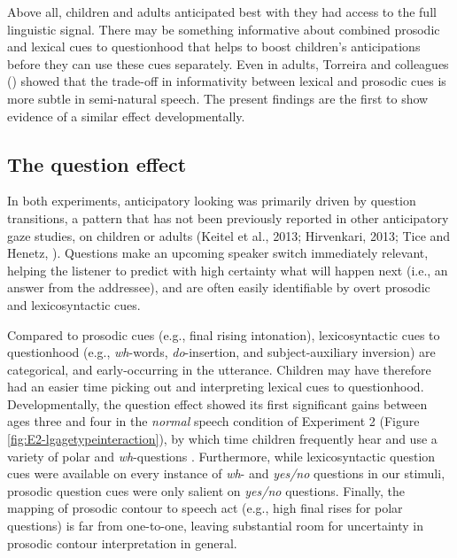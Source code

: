 \documentclass[authoryear, 12pt]{elsarticle}
\begin{document}
Above all, children and adults anticipated best with they had access to the full linguistic signal. There may be something informative about combined prosodic and lexical cues to questionhood that helps to boost children's anticipations before they can use these cues separately. Even in adults, Torreira and colleagues (\citeyear{torreira2015}) showed that the trade-off in informativity between lexical and prosodic cues is more subtle in semi-natural speech. The present findings are the first to show evidence of a similar effect developmentally.

\subsection{The question effect}

In both experiments, anticipatory looking was primarily driven by question transitions, a pattern that has not been previously reported in other anticipatory gaze studies, on children or adults (Keitel et al., 2013; Hirvenkari, 2013; Tice and Henetz, \citeyear{TiceHenetz11}). Questions make an upcoming speaker switch immediately relevant, helping the listener to predict with high certainty what will happen next (i.e., an answer from the addressee), and are often easily identifiable by overt prosodic and lexicosyntactic cues.

Compared to prosodic cues (e.g., final rising intonation), lexicosyntactic cues to questionhood (e.g., \textit{wh}-words, \textit{do}-insertion, and subject-auxiliary inversion) are categorical, and early-occurring in the utterance. Children may have therefore had an easier time picking out and interpreting lexical cues to questionhood. Developmentally, the question effect showed its first significant gains between ages three and four in the \textit{normal} speech condition of Experiment 2 (Figure \ref{fig:E2-lgagetypeinteraction}), by which time children frequently hear and use a variety of polar and \textit{wh}-questions \citep{clark2009}. Furthermore, while lexicosyntactic question cues were available on every instance of \textit{wh}- and \textit{yes/no} questions in our stimuli, prosodic question cues were only salient on \textit{yes/no} questions. Finally, the mapping of prosodic contour to speech act (e.g., high final rises for polar questions) is far from one-to-one, leaving substantial room for uncertainty in prosodic contour interpretation in general.
\end{document}
